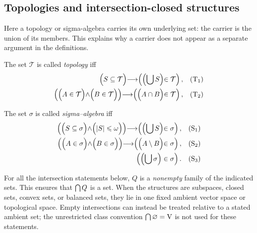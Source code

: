 \subsection{Topologies and intersection-closed structures}
Here a topology or sigma-algebra carries its own underlying set: the
carrier is the union of its members. This explains why a carrier does
not appear as a separate argument in the definitions.
\begin{definition}[topology]
The set $\mathcal{T}$ is called \textit{topology} iff
\begin{align*}
\left(S \subseteq \mathcal{T}\middle)
\implies
\middle(\middle(\union S\middle)\in \mathcal{T} \vphantom\union \right),
 && \text{(T$_1$)}\\
\left(\middle(
A\in \mathcal{T}\middle)\land \middle(B\in \mathcal{T}\middle)\middle)
\implies
\middle(\middle(A\cap B\middle)\in \mathcal{T} \vphantom\union \right),
 && \text{(T$_2$)}\\
\end{align*}
\end{definition}

\begin{definition}
The set $\sigma$ is called \textit{sigma--algebra} iff
\begin{align*}
\left(
\middle(
S \subseteq \sigma
\middle)
\land
\middle(
|S|\leqslant \omega
\middle)
\middle)
\implies
\middle(\middle(\union S\middle)\in \sigma \vphantom\union \right),
 && \text{(S$_1$)}\\
 \left(\middle(
A\in \sigma \middle)\land \middle(B\in \sigma\middle)\middle)
\implies
\middle(\middle(A\setminus B\middle)\in \sigma \vphantom\union \right),
 && \text{(S$_2$)}\\
\left( \left(\union \sigma\right) \in \sigma \vphantom\union \right).
 && \text{(S$_3$)}\\
\end{align*}
\end{definition}
For all the intersection statements below, $Q$ is a \emph{nonempty}
family of the indicated sets. This ensures that $\bigcap Q$ is a
set. When the structures are subspaces, closed sets, convex sets, or
balanced sets, they lie in one fixed ambient vector space or topological
space. Empty intersections can instead be treated relative to a stated
ambient set; the unrestricted class convention
$\bigcap\varnothing=\mathrm{V}$ is not used for these statements.

